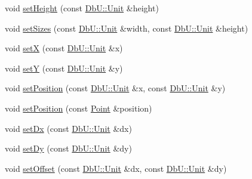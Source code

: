 \begin{DoxyCompactItemize}
void \mbox{\hyperlink{classHurricane_1_1Contact_a2fc2e7c85dc5495810544c48bb604712}{set\+Height}} (const \mbox{\hyperlink{group__DbUGroup_ga4fbfa3e8c89347af76c9628ea06c4146}{Db\+U\+::\+Unit}} \&height)
\item 
void \mbox{\hyperlink{classHurricane_1_1Contact_aa18aa1e78eba9f4c10ece0e20683faf5}{set\+Sizes}} (const \mbox{\hyperlink{group__DbUGroup_ga4fbfa3e8c89347af76c9628ea06c4146}{Db\+U\+::\+Unit}} \&width, const \mbox{\hyperlink{group__DbUGroup_ga4fbfa3e8c89347af76c9628ea06c4146}{Db\+U\+::\+Unit}} \&height)
\item 
void \mbox{\hyperlink{classHurricane_1_1Contact_a181436f128b65467e1ab94ffcb0c345b}{setX}} (const \mbox{\hyperlink{group__DbUGroup_ga4fbfa3e8c89347af76c9628ea06c4146}{Db\+U\+::\+Unit}} \&x)
\item 
void \mbox{\hyperlink{classHurricane_1_1Contact_a455b8925aae10157c9143b58a3a52e57}{setY}} (const \mbox{\hyperlink{group__DbUGroup_ga4fbfa3e8c89347af76c9628ea06c4146}{Db\+U\+::\+Unit}} \&y)
\item 
void \mbox{\hyperlink{classHurricane_1_1Contact_afac88ee8442e3e943a24bb526057851a}{set\+Position}} (const \mbox{\hyperlink{group__DbUGroup_ga4fbfa3e8c89347af76c9628ea06c4146}{Db\+U\+::\+Unit}} \&x, const \mbox{\hyperlink{group__DbUGroup_ga4fbfa3e8c89347af76c9628ea06c4146}{Db\+U\+::\+Unit}} \&y)
\item 
void \mbox{\hyperlink{classHurricane_1_1Contact_ad3ff25d47d1c00c53bb07bb0ff4067f1}{set\+Position}} (const \mbox{\hyperlink{classHurricane_1_1Point}{Point}} \&position)
\item 
void \mbox{\hyperlink{classHurricane_1_1Contact_a6ee60b9d228fe5487bf73dc396b94706}{set\+Dx}} (const \mbox{\hyperlink{group__DbUGroup_ga4fbfa3e8c89347af76c9628ea06c4146}{Db\+U\+::\+Unit}} \&dx)
\item 
void \mbox{\hyperlink{classHurricane_1_1Contact_a32ee96c21115ee9d197bc505fd48e37d}{set\+Dy}} (const \mbox{\hyperlink{group__DbUGroup_ga4fbfa3e8c89347af76c9628ea06c4146}{Db\+U\+::\+Unit}} \&dy)
\item 
void \mbox{\hyperlink{classHurricane_1_1Contact_a41ba972136e77d768f58ad0407d18f8e}{set\+Offset}} (const \mbox{\hyperlink{group__DbUGroup_ga4fbfa3e8c89347af76c9628ea06c4146}{Db\+U\+::\+Unit}} \&dx, const \mbox{\hyperlink{group__DbUGroup_ga4fbfa3e8c89347af76c9628ea06c4146}{Db\+U\+::\+Unit}} \&dy)
\end{DoxyCompactItemize}

